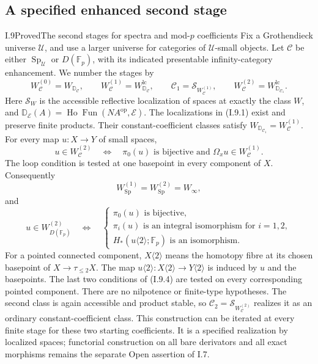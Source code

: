 \subsection{A specified enhanced second stage}
\begin{claim}{I.9}{Proved}{The second stages for spectra and mod-$p$ coefficients}
Fix a Grothendieck universe $\mathcal U$, and use a larger universe for categories of $\mathcal U$-small objects. Let $\mathcal C$ be either $\operatorname{Sp}_{\mathcal U}$ or $D(\mathbb F_p)$, with its indicated presentable infinity-category enhancement. We number the stages by
\[
 W_{\mathcal C}^{(0)}=W_{\mathbb D_{\mathcal C}},\qquad
 W_{\mathcal C}^{(1)}=W_{\mathbb D_{\mathcal C}}^{\mathrm{lc}},
 \qquad
 \mathcal C_1=\mathcal S_{W_{\mathcal C}^{(1)}},\qquad
 W_{\mathcal C}^{(2)}=W_{\mathbb D_{\mathcal C_1}}^{\mathrm{lc}}.
 \tag{I.9.1}
\]
Here $\mathcal S_W$ is the accessible reflective localization of spaces at exactly the class $W$, and
$\mathbb D_{\mathcal E}(A)=\operatorname{Ho}\operatorname{Fun}(NA^{\mathrm{op}},\mathcal E)$.
The localizations in (I.9.1) exist and preserve finite products. Their constant-coefficient classes satisfy
$W_{\mathbb D_{\mathcal C_1}}=W_{\mathcal C}^{(1)}$.
For every map $u:X\to Y$ of small spaces,
\[
 u\in W_{\mathcal C}^{(2)}
 \quad\Longleftrightarrow\quad
 \pi_0(u)\text{ is bijective and }
 \Omega_xu\in W_{\mathcal C}^{(1)}.
 \tag{I.9.2}
\]
The loop condition is tested at one basepoint in every component of $X$.
Consequently
\[
 W_{\operatorname{Sp}}^{(1)}
   =W_{\operatorname{Sp}}^{(2)}=W_\infty,
 \tag{I.9.3}
\]
and
\[
 u\in W_{D(\mathbb F_p)}^{(2)}
 \quad\Longleftrightarrow\quad
 \begin{cases}
 \pi_0(u)\text{ is bijective},\\
 \pi_i(u)\text{ is an integral isomorphism for }i=1,2,\\
 H_*(u\langle2\rangle;\mathbb F_p)\text{ is an isomorphism}.
 \end{cases}
 \tag{I.9.4}
\]
For a pointed connected component, $X\langle2\rangle$ means the homotopy fibre at its chosen basepoint of $X\to\tau_{\leq2}X$. The map $u\langle2\rangle:X\langle2\rangle\to Y\langle2\rangle$ is induced by $u$ and the basepoints. The last two conditions of (I.9.4) are tested on every corresponding pointed component. There are no nilpotence or finite-type hypotheses. The second class is again accessible and product stable, so $\mathcal C_2=\mathcal S_{W_{\mathcal C}^{(2)}}$ realizes it as an ordinary constant-coefficient class. This construction can be iterated at every finite stage for these two starting coefficients. It is a specified realization by localized spaces; functorial construction on all bare derivators and all exact morphisms remains the separate Open assertion of I.7.
\end{claim}
